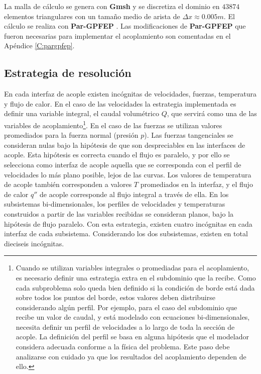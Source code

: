 La malla de cálculo se genera con \textbf{Gmsh} \cite{gmsh} y se discretiza el dominio en $43874$ elementos triangulares
con un tamaño medio de arista de $\Delta x \approx 0.005m$.
El cálculo se realiza con \textbf{Par-GPFEP} \cite{gpfep} \cite{pargpfep}.
Las modificaciones de \textbf{Par-GPFEP} que fueron necesarias para implementar el acoplamiento son comentadas en el Apéndice \ref{C:pargpfep}.


\subsection*{Estrategia de resolución}

En cada interfaz de acople existen incógnitas de velocidades, fuerzas, temperatura y flujo de calor.
En el caso de las velocidades la estrategia implementada es definir una variable integral, 
el caudal volumétrico $Q$, que servirá como una de las variables de acoplamiento\footnote{
Cuando se utilizan variables integrales o promediadas para el acoplamiento, es necesario definir una estrategia extra en el subdominio que la recibe.
Como cada subproblema solo queda bien definido si la condición de borde está dada sobre todos los puntos del borde, estos valores deben distribuirse considerando algún perfil.
Por ejemplo, para el caso del subdominio que recibe un valor de caudal, y está modelado con ecuaciones bi-dimensionales, necesita definir un perfil de velocidades a lo largo de toda la sección de acople.
La definición del perfil se basa en alguna hipótesis que el modelador considera adecuada conforme a la física del problema.
Este paso debe analizarse con cuidado ya que los resultados del acoplamiento dependen de ello.
}.
En el caso de las fuerzas se utilizan valores promediados para la fuerza normal (presión $p$).
Las fuerzas tangenciales se consideran nulas bajo la hipótesis de que son despreciables en las interfaces de acople.
Esta hipótesis es correcta cuando el flujo es paralelo, 
y por ello se selecciona como interfaz de acople aquella que se corresponda con el perfil de velocidades lo más plano posible, lejos de las curvas.
Los valores de temperatura de acople también corresponden a valores $T$ promediados en la interfaz,
y el flujo de calor $q''$ de acople corresponde al flujo integral a través de ella.
En los subsistemas bi-dimensionales, los perfiles de velocidades y temperaturas construidos a partir de las variables recibidas se consideran planos,
bajo la hipótesis de flujo paralelo.
Con esta estrategia, existen cuatro incógnitas en cada interfaz de cada subsistema. 
Considerando los dos subsistemas, existen en total dieciseis incógnitas.

